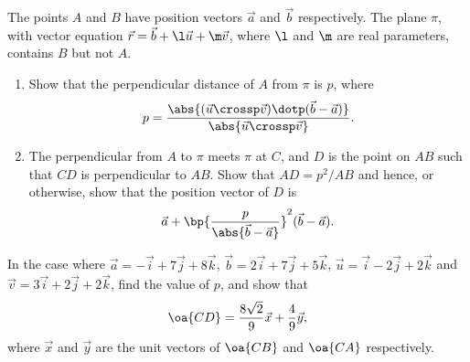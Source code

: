 \begin{problem}[\chili]
    The points $A$ and $B$ have position vectors $\vec a$ and $\vec b$ respectively. The plane $\pi$, with vector equation $\vec r = \vec b + \l \vec u + \m \vec v$, where $\l$ and $\m$ are real parameters, contains $B$ but not $A$.

    \begin{enumerate}
        \item Show that the perpendicular distance of $A$ from $\pi$ is $p$, where \[p = \frac{\abs{(\vec u \crossp \vec v) \dotp (\vec b - \vec a)}}{\abs{\vec u \crossp \vec v}}.\]
        \item The perpendicular from $A$ to $\pi$ meets $\pi$ at $C$, and $D$ is the point on $AB$ such that $CD$ is perpendicular to $AB$. Show that $AD = p^2 / AB$ and hence, or otherwise, show that the position vector of $D$ is \[\vec a + \bp{\frac{p}{\abs{\vec b - \vec a}}}^2 (\vec b - \vec a).\]
    \end{enumerate}

    In the case where $\vec a = -\vec i + 7\vec j + 8\vec k$, $\vec b = 2\vec i + 7\vec j + 5\vec k$, $\vec u = \vec i - 2\vec j + 2\vec k$ and $\vec v = 3\vec i + 2\vec j + 2\vec k$, find the value of $p$, and show that \[\oa{CD} = \frac{8\sqrt{2}}9 \vec x + \frac49 \vec y,\] where $\vec x$ and $\vec y$ are the unit vectors of $\oa{CB}$ and $\oa{CA}$ respectively.
\end{problem}
